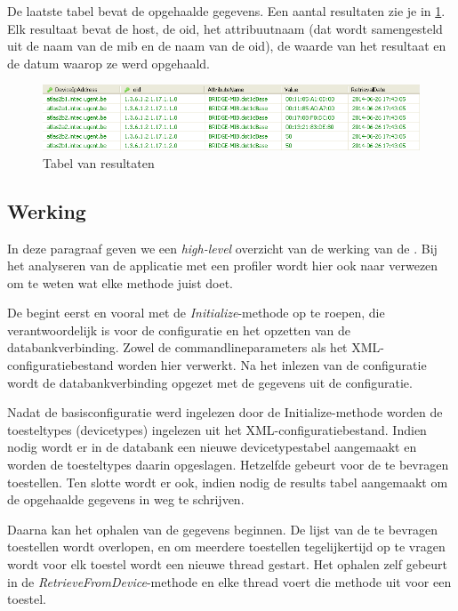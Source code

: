 De laatste tabel bevat de opgehaalde gegevens.
Een aantal resultaten zie je in \cref{fig-db-results}.
Elk resultaat bevat de host, de \gls{oid}, het attribuutnaam (dat wordt samengesteld uit de naam van de \gls{mib} en de naam van de \gls{oid}),
de waarde van het resultaat en de datum waarop ze werd opgehaald.

\begin{figure}[h]
	\centering
	\includegraphics[scale=0.50]{figures/database/results}
	\caption{Tabel van resultaten}
	\label{fig-db-results}
\end{figure}


\subsection{Werking}
\label{werking}

In deze paragraaf geven we een \textit{high-level} overzicht van de werking van de \nwmretriever{}.
Bij het analyseren van de applicatie met een profiler wordt hier ook naar verwezen om te weten wat elke methode juist doet.

De \nwmretriever{} begint eerst en vooral met de \textit{Initialize}-methode op te roepen,
die verantwoordelijk is voor de configuratie en het opzetten van de databankverbinding.
Zowel de commandlineparameters als het XML-configuratiebestand worden hier verwerkt.
Na het inlezen van de configuratie wordt de databankverbinding opgezet met de gegevens uit de configuratie.

Nadat de basisconfiguratie werd ingelezen door de Initialize-methode worden de toesteltypes (devicetypes) ingelezen uit het XML-configuratiebestand.
Indien nodig wordt er in de databank een nieuwe devicetypestabel aangemaakt en worden de toesteltypes daarin opgeslagen.
Hetzelfde gebeurt voor de te bevragen toestellen.
Ten slotte wordt er ook, indien nodig de results tabel aangemaakt om de opgehaalde gegevens in weg te schrijven.

Daarna kan het ophalen van de gegevens beginnen.
De lijst van de te bevragen toestellen wordt overlopen, en om meerdere toestellen tegelijkertijd op te vragen
wordt voor elk toestel wordt een nieuwe thread gestart.
Het ophalen zelf gebeurt in de \textit{RetrieveFromDevice}-methode en elke thread voert die methode uit voor een toestel.

